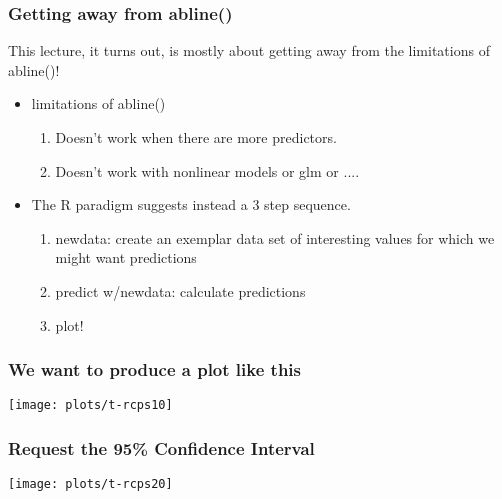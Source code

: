 \documentclass[10pt,english]{beamer}
\begin{document}
\begin{frame}[containsverbatim]
\frametitle{Getting away from abline()}

This lecture, it turns out, is mostly about getting away from the
limitations of abline()!
\begin{itemize}
\item limitations of abline()

\begin{enumerate}
\item Doesn't work when there are more predictors.
\item Doesn't work with nonlinear models or glm or ....
\end{enumerate}
\item The R paradigm suggests instead a 3 step sequence.

\begin{enumerate}
\item newdata: create an exemplar data set of interesting values for which
we might want predictions
\item predict w/newdata: calculate predictions
\item plot!
\end{enumerate}
\end{itemize}
\end{frame}

\begin{frame}[containsverbatim]
\frametitle{We want to produce a plot like this}





\texttt{[image: plots/t-rcps10]}

\end{frame}

\begin{frame}[containsverbatim]
\frametitle{Request the 95\% Confidence Interval}




\texttt{[image: plots/t-rcps20]}

\end{frame}
\end{document}
